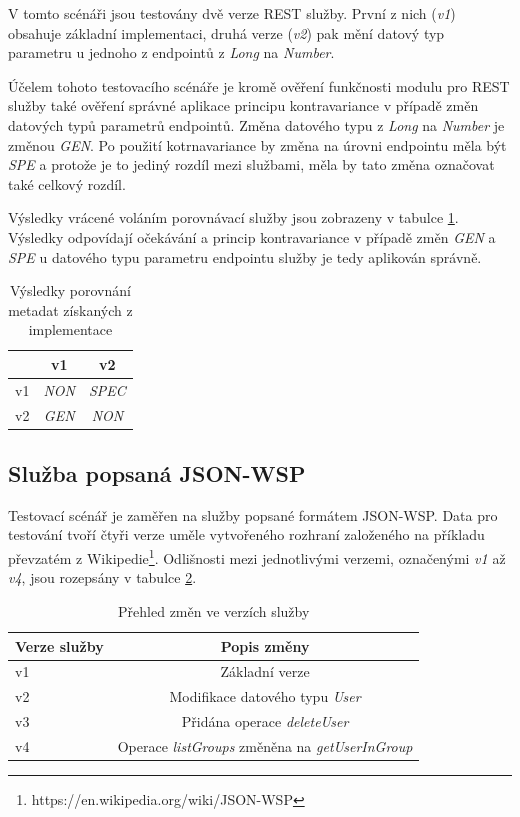 \documentclass[czech,DP]{thesiskiv}
\begin{document}
V tomto scénáři jsou testovány dvě verze REST služby. První z nich (\textit{v1}) obsahuje základní implementaci, druhá verze (\textit{v2}) pak mění datový typ parametru u jednoho z endpointů z \textit{Long} na \textit{Number}.

Účelem tohoto testovacího scénáře je kromě ověření funkčnosti modulu pro REST služby také ověření správné aplikace principu kontravariance v případě změn datových typů parametrů endpointů. Změna datového typu z \textit{Long} na \textit{Number} je změnou \textit{GEN}. Po použití kotrnavariance by změna na úrovni endpointu měla být \textit{SPE} a protože je to jediný rozdíl mezi službami, měla by tato změna označovat také celkový rozdíl.

Výsledky vrácené voláním porovnávací služby jsou zobrazeny v tabulce \ref{tab:jersey-cmp-res}. Výsledky odpovídají očekávání a princip kontravariance v případě změn \textit{GEN} a \textit{SPE} u datového typu parametru endpointu služby je tedy aplikován správně.

\begin{table}[h]
	\centering
	\begin{tabular}{|l||c|c|}
		\hline
		& v1 & v2 \\
		\hline
		\hline
		v1 & \textit{NON} & \textit{SPEC} \\
		\hline
		v2 & \textit{GEN} & \textit{NON} \\
		\hline
	\end{tabular}
	\caption{Výsledky porovnání metadat získaných z implementace}
	\label{tab:jersey-cmp-res}
\end{table}
	
\subsection{Služba popsaná JSON-WSP}

Testovací scénář je zaměřen na služby popsané formátem JSON-WSP. Data pro testování tvoří čtyři verze uměle vytvořeného rozhraní založeného na příkladu převzatém z Wikipedie\footnote{https://en.wikipedia.org/wiki/JSON-WSP}. Odlišnosti mezi jednotlivými verzemi, označenými \textit{v1} až \textit{v4}, jsou rozepsány v tabulce \ref{tab:json-wsp-diffs}.

\begin{table}[h]
	\centering
	\begin{tabular}{|l|c|}
		\hline
		Verze služby & Popis změny \\
		\hline
		\hline
		v1 & Základní verze \\
		\hline
		v2 & Modifikace datového typu \textit{User} \\
		\hline
		v3 & Přidána operace \textit{deleteUser} \\
		\hline
		v4 & Operace \textit{listGroups} změněna na \textit{getUserInGroup} \\
		\hline
	\end{tabular}
	\caption{Přehled změn ve verzích služby}
	\label{tab:json-wsp-diffs}
\end{table}
\end{document}
